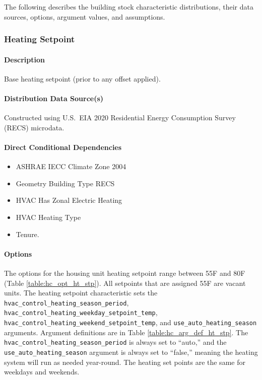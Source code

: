 The following describes the building stock characteristic distributions, their data sources, options, argument values, and assumptions.

\subsubsection{Heating Setpoint}
\paragraph{Description}
Base heating setpoint (prior to any offset applied).

\paragraph{Distribution Data Source(s)}
Constructed using U.S.~EIA 2020 Residential Energy Consumption Survey (RECS) microdata.

\paragraph{Direct Conditional Dependencies}
\begin{itemize}
    \item ASHRAE IECC Climate Zone 2004
    \item Geometry Building Type RECS
    \item HVAC Has Zonal Electric Heating
    \item HVAC Heating Type
    \item Tenure.
\end{itemize}

\paragraph{Options}
The options for the housing unit heating setpoint range between 55\degree F and 80\degree F (Table \ref{table:hc_opt_ht_stp}). All setpoints that are assigned 55\degree F are vacant units. The heating setpoint characteristic sets the \texttt{hvac\_control\_heating\_season\_period}, \texttt{hvac\_control\_heating\_weekday\_setpoint\_temp}, \texttt{hvac\_control\_heating\_weekend\_setpoint\_temp}, and \texttt{use\_auto\_heating\_season} arguments. Argument definitions are in Table \ref{table:hc_arg_def_ht_stp}. The \texttt{hvac\_control\_heating\_season\_period} is always set to ``auto,'' and the \texttt{use\_auto\_heating\_season} argument is always set to ``false,'' meaning the heating system will run as needed year-round. The heating set points are the same for weekdays and weekends.

